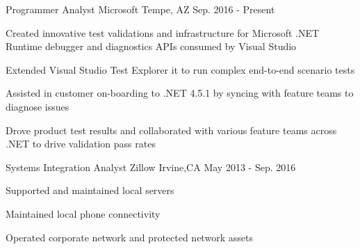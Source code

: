 

\begin{cventries}

  \cventry
    {Programmer Analyst} %
    {Microsoft} %
    {Tempe, AZ} %
    {Sep. 2016 - Present} %
    {
      \begin{cvitems} %
        \item {Created innovative test validations and infrastructure for Microsoft .NET Runtime debugger and diagnostics APIs consumed by Visual Studio}
        \item {Extended Visual Studio Test Explorer it to run complex end-to-end scenario tests}
        \item {Assisted in customer on-boarding to .NET 4.5.1 by syncing with feature teams to diagnose issues}
        \item {Drove product test results and collaborated with various feature teams across .NET to drive validation pass rates}
      \end{cvitems}
    }

  \cventry
    {Systems Integration Analyst} %
    {Zillow} %
    {Irvine,CA} %
    {May 2013 - Sep. 2016} %
    {
      \begin{cvitems} %
        \item {Supported and maintained local servers}
        \item {Maintained local phone connectivity}
        \item {Operated corporate network and protected network assets}
      \end{cvitems}
    }


\end{cventries}
